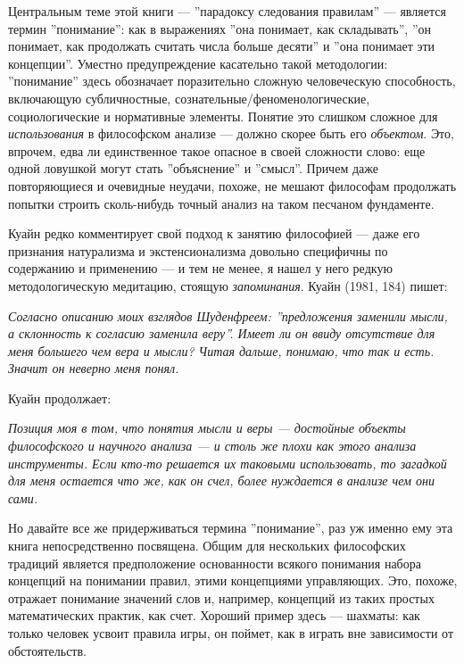\documentclass[11pt]{book}
\begin{document}
\qquad

Центральным теме этой книги --- ''парадоксу следования правилам'' --- является термин ''понимание'': как в выражениях ''она понимает, как складывать'', ''он понимает, как продолжать считать числа больше десяти'' и ''она понимает эти концепции''. Уместно предупреждение касательно такой методологии: ''понимание'' здесь обозначает поразительно сложную человеческую способность, включающую субличностные, сознательные/феноменологические, социологические и нормативные элементы. Понятие это слишком сложное для \textit{использования} в философском анализе --- должно скорее быть его \textit{объектом}. Это, впрочем, едва ли единственное такое опасное в своей сложности слово: еще одной ловушкой могут стать ''объяснение'' и ''смысл''. Причем даже повторяющиеся и очевидные неудачи, похоже, не мешают философам продолжать попытки строить сколь-нибудь точный анализ на таком песчаном фундаменте.

Куайн редко комментирует свой подход к занятию философией --- даже его признания натурализма и экстенсионализма довольно специфичны по содержанию и применению --- и тем не менее, я нашел у него редкую методологическую медитацию, стоящую \textit{запоминания}. Куайн (1981, 184) пишет:

\smallskip

\textit{Согласно описанию моих взглядов Шуденфреем: ''предложения заменили мысли, а склонность к согласию заменила веру''. Имеет ли он ввиду отсутствие для меня большего чем вера и мысли? Читая дальше, понимаю, что так и есть. Значит он неверно меня понял.}

\smallskip

Куайн продолжает:

\smallskip

\textit{Позиция моя в том, что понятия мысли и веры --- достойные объекты философского и научного анализа --- и столь же плохи как этого анализа инструменты. Если кто-то решается их таковыми использовать, то загадкой для меня остается что же, как он счел, более нуждается в анализе чем они сами.}

\smallskip

Но давайте все же придерживаться термина ''понимание'', раз уж именно ему эта книга непосредственно посвящена. Общим для нескольких философских традиций является предположение основанности всякого понимания набора концепций на понимании правил, этими концепциями управляющих. Это, похоже, отражает понимание значений слов и, например, концепций из таких простых математических практик, как счет. Хороший пример здесь --- шахматы: как только человек усвоит правила игры, он поймет, как в играть вне зависимости от обстоятельств.
\end{document}
